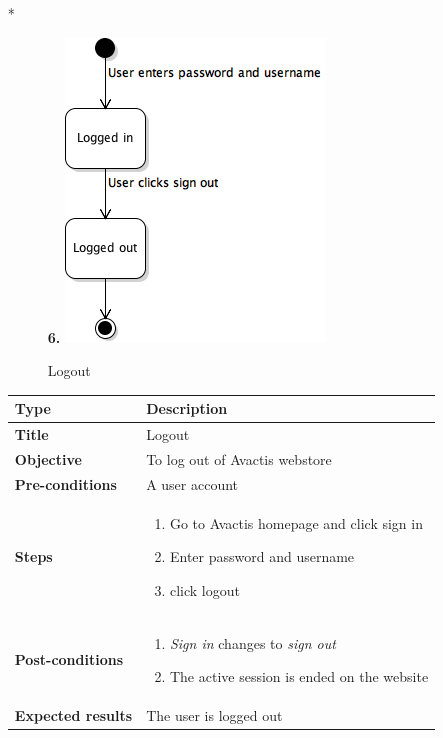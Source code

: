 \documentclass[UKenglish,12pt]{article}
\begin{document}
\begin{itemize}
\item[*]
\begin{figure}[!htbp]
\textbf{6.\newline}
\centering
\includegraphics[scale=0.6,keepaspectratio]{Images/Logout.png}
\caption{Logout}
\end{figure}


\begin{table}[!htbp]
\small
\begin{tabular}{| p{5cm} | p{10cm} | }
	\hline
	\textbf{Type} & \textbf{Description} \\ \hline
	 \textbf{Title} & Logout \\ \hline
	 \textbf{Objective} & To log out of Avactis webstore \\ \hline
	 \textbf{Pre-conditions} & A user account \\ \hline
	 \textbf{Steps} & \begin{enumerate} \item Go to Avactis homepage and click sign in \item Enter password and username \item click logout  \end{enumerate}\\ \hline
	 \textbf{Post-conditions} & \begin{enumerate}\item\textit{Sign in} changes to \textit{sign out} \item The active session is ended on the website \end{enumerate}  \\ \hline
	 \textbf{Expected results} & The user is logged out\\ 
	 \hline
\end{tabular} %
\end{table}


\end{itemize}
\end{document}
